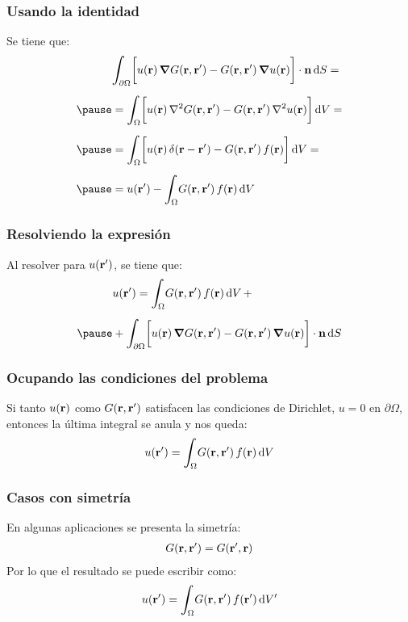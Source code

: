 \documentclass[12pt]{beamer}
\begin{document}
\begin{frame}
\frametitle{Usando la identidad}
Se tiene que:
\fontsize{12}{12}\selectfont
\begin{eqnarray}
\begin{aligned}[b]
&\scaleint{6ex}_{\bs \partial \Omega} \bigg[ u (\vb{r}) \, \grad{G (\vb{r}, \vb{\pderivada{r}})} - G (\vb{r}, \vb{\pderivada{r}}) \, \grad{u (\vb{r})} \bigg] \cdot \vb{n} \dd{S} = \\[0.5em] \pause
&= \scaleint{6ex}_{\bs \Omega} \bigg[ u (\vb{r}) \, \laplacian{G (\vb{r}, \vb{\pderivada{r}})} - G (\vb{r}, \vb{\pderivada{r}}) \, \laplacian{u (\vb{r})} \bigg] \dd{V} = \\[0.5em] \pause
&= \scaleint{6ex}_{\bs \Omega} \bigg[ u (\vb{r}) \, \delta (\vb{r} - \vb{\pderivada{r}}) - G (\vb{r}, \vb{\pderivada{r}}) \, f (\vb{r}) \bigg] \dd{V} = \\[0.5em] \pause
&= u (\vb{\pderivada{r}}) - \scaleint{6ex}_{\bs \Omega} G (\vb{r}, \vb{\pderivada{r}}) \, f (\vb{r}) \dd{V}
\end{aligned}
\label{eq:ecuacion_07_02}
\end{eqnarray}
\end{frame}
\begin{frame}
\frametitle{Resolviendo la expresión}
Al resolver para $u (\vb{\ensuremath{{r}^{\prime}}})$, se tiene que:
\pause
\begin{eqnarray}
\begin{aligned}[b]
&u (\vb{\pderivada{r}}) = \scaleint{6ex}_{\bs \Omega} G (\vb{r}, \vb{\pderivada{r}}) \, f (\vb{r}) \dd{V} + \\[0.5em] \pause
&+ \scaleint{6ex}_{\bs \partial \Omega} \bigg[ u (\vb{r}) \, \grad{G (\vb{r}, \vb{\pderivada{r}})} - G (\vb{r}, \vb{\pderivada{r}}) \, \grad{u (\vb{r})} \bigg] \cdot \vb{n} \dd{S}
\end{aligned}
\label{eq:ecuacion_07_03}
\end{eqnarray}
\end{frame}
\begin{frame}
\frametitle{Ocupando las condiciones del problema}
Si tanto $u (\vb{r})$ como $G (\vb{r}, \vb{\ensuremath{{r}^{\prime}}})$ satisfacen las condiciones de Dirichlet, $u = 0$ en $\partial \Omega$, \pause entonces la última integral se anula y nos queda:
\begin{align*}
u (\vb{\pderivada{r}}) = \scaleint{6ex}_{\bs \Omega} G (\vb{r}, \vb{\pderivada{r}}) \, f (\vb{r}) \dd{V}
\end{align*}
\end{frame}
\begin{frame}
\frametitle{Casos con simetría}
En algunas aplicaciones se presenta la simetría:
\pause
\begin{align*}
G (\vb{r}, \vb{\ensuremath{{r}^{\prime}}}) = G (\vb{\ensuremath{{r}^{\prime}}}, \vb{r})
\end{align*}
\pause
Por lo que el resultado se puede escribir como:
\pause
\begin{align*}
u (\vb{\pderivada{r}}) = \scaleint{6ex}_{\bs \Omega} G (\vb{r}, \vb{\pderivada{r}}) \, f (\vb{\pderivada{r}}) \dd{\pderivada{V}}
\end{align*}
\end{frame}
\end{document}
